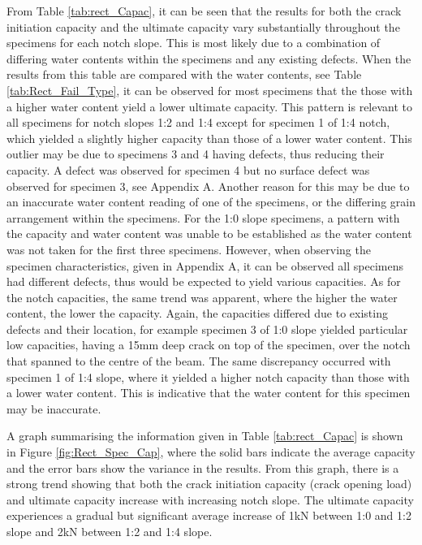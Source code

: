 \documentclass[11pt,a4paper]{article}
\numberwithin{equation}{subsection}
\begin{document}
\noindent
From Table \ref{tab:rect_Capac}, it can be seen that the results for both the crack initiation capacity and the ultimate capacity vary substantially throughout the specimens for each notch slope. This is most likely due to a combination of differing water contents within the specimens and any existing defects. When the results from this table are compared with the water contents, see Table \ref{tab:Rect_Fail_Type}, it can be observed for most specimens that the those with a higher water content yield a lower ultimate capacity. This pattern is relevant to all specimens for notch slopes 1:2 and 1:4 except for specimen 1 of 1:4 notch, which yielded a slightly higher capacity than those of a lower water content. This outlier may be due to specimens 3 and 4 having defects, thus reducing their capacity. A defect was observed for specimen 4 but no surface defect was observed for specimen 3, see Appendix A. Another reason for this may be due to an inaccurate water content reading of one of the specimens, or the differing grain arrangement within the specimens. For the 1:0 slope specimens, a pattern with the capacity and water content was unable to be established as the water content was not taken for the first three specimens. However, when observing the specimen characteristics, given in Appendix A, it can be observed all specimens had different defects, thus would be expected to yield various capacities. As for the notch capacities, the same trend was apparent, where the higher the water content, the lower the capacity. Again, the capacities differed due to existing defects and their location, for example specimen 3 of 1:0 slope yielded particular low capacities, having a 15mm deep crack on top of the specimen, over the notch that spanned to the centre of the beam. The same discrepancy occurred with specimen 1 of 1:4 slope, where it yielded a higher notch capacity than those with a lower water content. This is indicative that the water content for this specimen may be inaccurate.  

\vspace*{\baselineskip}

\noindent
A graph summarising the information given in Table \ref{tab:rect_Capac} is shown in Figure \ref{fig:Rect_Spec_Cap}, where the solid bars indicate the average capacity and the error bars show the variance in the results. From this graph, there is a strong trend showing that both the crack initiation capacity (crack opening load) and ultimate capacity increase with increasing notch slope. The ultimate capacity experiences a gradual but significant average increase of 1kN between 1:0 and 1:2 slope and 2kN between 1:2 and 1:4 slope.  
\end{document}
